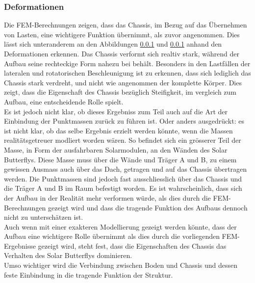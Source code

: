 \subsubsection{Deformationen}
Die FEM-Berechnungen zeigen, dass das Chassis, im Bezug auf das Übernehmen von Lasten, eine wichtigere Funktion übernimmt, als zuvor angenommen. Dies lässt sich unteranderem an den Abbildungen \ref{} und \ref{} anhand den Deformationen erkennen. Das Chassis verformt sich realtiv stark, während der Aufbau seine rechteckige Form nahezu bei behält. Besonders in den Lastfällen der lateralen und rotatorischen Beschleunigung ist zu erkennen, dass sich lediglich das Chassis stark verdreht, und nicht wie angenommen der komplette Körper. Dies zeigt, dass die Eigenschaft des Chassis bezüglich Steifigkeit, im vergleich zum Aufbau, eine entscheidende Rolle spielt. \\


Es ist jedoch nicht klar, ob dieses Ergebniss zum Teil auch auf die Art der Einbindung der Punktmassen zurück zu führen ist. Oder anders ausgedrückt: es ist nicht klar, ob das selbe Ergebnis erzielt werden könnte, wenn die Massen realitätsgetreuer modliert worden wären. So befindet sich ein grösserer Teil der Masse, in Form der ausfahrbaren Solarmodulen, an den Wänden des Solar Butterflys. Diese Masse muss über die Wände und Träger A und B, zu einem gewissen Ausmass auch über das Dach, getragen und auf das Chassis übertragen werden. Die Punktmassen sind jedoch fast ausschliesslich über das Chassis und die Träger A und B im Raum befestigt worden. Es ist wahrscheinlich, dass sich der Aufbau in der Realität mehr verformen würde, als dies durch die FEM-Berechnungen gezeigt wird und dass die tragende Funktion des Aufbaus dennoch nicht zu unterschätzen ist. \\
Auch wenn mit einer exakteren Modellierung gezeigt werden könnte, dass der Aufbau eine wichtigere Rolle übernimmt als dies durch die vorliegenden FEM-Ergebnisse gezeigt wird, steht fest, dass die Eigenschaften des Chassis das Verhalten des Solar Butterflys dominieren.\\
Umso wichtiger wird die Verbindung zwischen Boden und Chassis und dessen feste Einbindung in die tragende Funktion der Struktur.

\newpage
